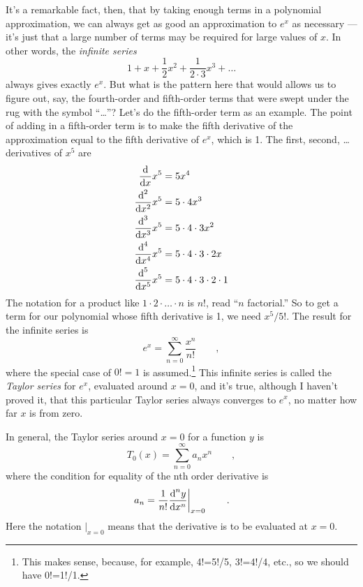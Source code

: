 It's a remarkable fact, then, that by taking enough terms in a polynomial approximation, we can always get as good an
approximation to $e^x$ as necessary --- it's just that a large number of terms may be required for large values of $x$.
In other words, the \emph{infinite series}
\begin{equation*}
   1+x+\frac{1}{2}x^2+\frac{1}{2\cdot3}x^3+\ldots
\end{equation*}
always gives exactly $e^x$. But what is the pattern here that would allows us to figure out, say, the fourth-order
and fifth-order terms that were swept under the rug with the symbol ``\ldots''? Let's do the fifth-order term as
an example. The point of adding in a fifth-order term is to make the fifth derivative of the approximation equal
to the fifth derivative of $e^x$, which is 1. The first, second, \ldots derivatives of $x^5$ are
\begin{align*}
  \frac{\textup{d}}{\textup{d} x}x^5 &= 5x^4 \\
  \frac{\textup{d}^2}{\textup{d} x^2}x^5 &= 5\cdot4 x^3 \\
  \frac{\textup{d}^3}{\textup{d} x^3}x^5 &= 5\cdot4\cdot3 x^2 \\
  \frac{\textup{d}^4}{\textup{d} x^4}x^5 &= 5\cdot4\cdot3\cdot2 x \\
  \frac{\textup{d}^5}{\textup{d} x^5}x^5 &= 5\cdot4\cdot3\cdot2\cdot1  
\end{align*}
The notation for a product like $1\cdot2\cdot\ldots\cdot n$ is $n!$, read ``$n$ factorial.'' So to get a term
for our polynomial whose fifth derivative is 1, we need $x^5/5!$. The result for the infinite series is
\begin{equation*}
  e^x = \sum_{n=0}^\infty \frac{x^n}{n!} \qquad ,
\end{equation*}
where the special case of $0!=1$ is assumed.\footnote{This makes sense, because, for example, 4!=5!/5, 3!=4!/4, etc., so
we should have 0!=1!/1.} This infinite series is called the \emph{Taylor series} for $e^x$, evaluated around $x=0$, and it's true, although I haven't proved it,
that this particular Taylor series always converges to $e^x$, no matter how far $x$ is from zero.

In general, the Taylor series
around $x=0$ for a function $y$ is
\begin{equation*}
  T_0(x) = \sum_{n=0}^\infty a_n x^n \qquad ,
\end{equation*}
where the condition for equality of the nth order derivative is
\begin{equation*}
  \left. a_n = \frac{1}{n!}\frac{\textup{d}^n y}{\textup{d} x^n}\right|_{x=0} \qquad .
\end{equation*}
Here the notation $\left.\right|_{x=0}$ means that the derivative is to be evaluated at $x=0$.

